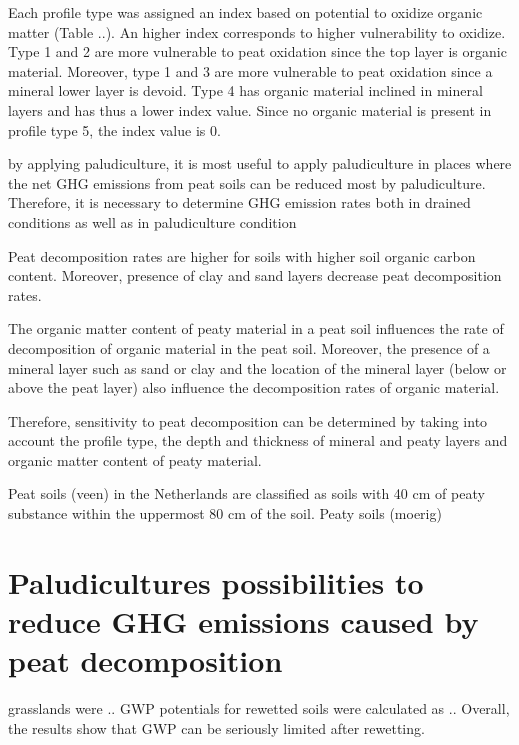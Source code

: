 {\begin{enumerate}
Each profile type was assigned an index based on potential to oxidize organic matter (Table ..). An higher index corresponds to higher vulnerability to oxidize. Type 1 and 2 are more vulnerable to peat oxidation since the top layer is organic material. Moreover, type 1 and 3 are more vulnerable to peat oxidation since a mineral lower layer is devoid. Type 4 has organic material inclined in mineral layers and has thus a lower index value. Since no organic material is present in profile type 5, the index value is 0. 





by applying paludiculture, it is most useful to apply paludiculture in places where the net GHG emissions from peat soils can be reduced most by paludiculture. Therefore, it is necessary to determine GHG emission rates both in drained conditions as well as in paludiculture condition


Peat decomposition rates are higher for soils with higher soil organic carbon content. Moreover, presence of clay and sand layers decrease peat decomposition rates. 

The organic matter content of peaty material in a peat soil influences the rate of decomposition of organic material in the peat soil. Moreover, the presence of a mineral layer such as sand or clay and the location of the mineral layer (below or above the peat layer) also influence the decomposition rates of organic material. 

Therefore, sensitivity to peat decomposition can be determined by taking into account the profile type, the depth and thickness of mineral and peaty layers and organic matter content of peaty material. 

Peat soils (veen) in the Netherlands are classified as soils with 40 cm of peaty substance within the uppermost 80 cm of the soil. Peaty soils (moerig) 


\section{Paludicultures possibilities to reduce GHG emissions caused by peat decomposition}

 grasslands were .. GWP potentials for rewetted soils were calculated as .. Overall, the results show that GWP can be seriously limited after rewetting. 
 


\end{enumerate}}
